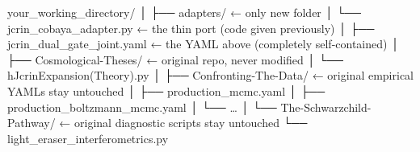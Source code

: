 your_working_directory/
│
├── adapters/                          ← only new folder
│   └── jcrin_cobaya_adapter.py        ← the thin port (code given previously)
│
├── jcrin_dual_gate_joint.yaml         ← the YAML above (completely self-contained)
│
├── Cosmological-Theses/               ← original repo, never modified
│   └── hJcrinExpansion(Theory).py
│
├── Confronting-The-Data/              ← original empirical YAMLs stay untouched
│   ├── production_mcmc.yaml
│   ├── production_boltzmann_mcmc.yaml
│   └── \ldots
│
└── The-Schwarzchild-Pathway/          ← original diagnostic scripts stay untouched
    └── light_eraser_interferometrics.py

